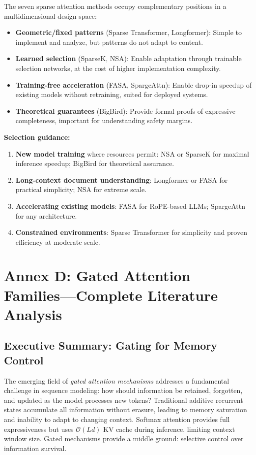 \documentclass[11pt,a4paper]{article}
\begin{document}
The seven sparse attention methods occupy complementary positions in a multidimensional design space:

\begin{itemize}[leftmargin=*]
    \item \textbf{Geometric/fixed patterns} (Sparse Transformer, Longformer): Simple to implement and analyze, but patterns do not adapt to content.
    \item \textbf{Learned selection} (SparseK, NSA): Enable adaptation through trainable selection networks, at the cost of higher implementation complexity.
    \item \textbf{Training-free acceleration} (FASA, SpargeAttn): Enable drop-in speedup of existing models without retraining, suited for deployed systems.
    \item \textbf{Theoretical guarantees} (BigBird): Provide formal proofs of expressive completeness, important for understanding safety margins.
\end{itemize}

\textbf{Selection guidance:}
\begin{enumerate}[leftmargin=*]
    \item \textbf{New model training} where resources permit: NSA or SparseK for maximal inference speedup; BigBird for theoretical assurance.
    \item \textbf{Long-context document understanding}: Longformer or FASA for practical simplicity; NSA for extreme scale.
    \item \textbf{Accelerating existing models}: FASA for RoPE-based LLMs; SpargeAttn for any architecture.
    \item \textbf{Constrained environments}: Sparse Transformer for simplicity and proven efficiency at moderate scale.
\end{enumerate}

\section{Annex D: Gated Attention Families---Complete Literature Analysis}
\label{sec:annex-gated}

\subsection{Executive Summary: Gating for Memory Control}

The emerging field of \emph{gated attention mechanisms} addresses a fundamental challenge in sequence modeling: how should information be retained, forgotten, and updated as the model processes new tokens? Traditional additive recurrent states accumulate all information without erasure, leading to memory saturation and inability to adapt to changing context. Softmax attention provides full expressiveness but uses $\mathcal{O}(Ld)$ KV cache during inference, limiting context window size. Gated mechanisms provide a middle ground: selective control over information survival.
\end{document}
